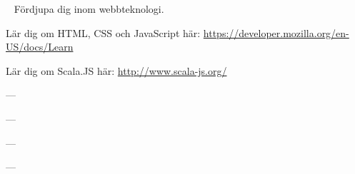 \SOLUTION


\TaskSolved \what

\SubtaskSolved

\SubtaskSolved

\SubtaskSolved


\QUESTEND






\WHAT{}

\QUESTBEGIN

\Task  \what~ Fördjupa dig inom webbteknologi.

\Subtask Lär dig om HTML, CSS och JavaScript här: \url{https://developer.mozilla.org/en-US/docs/Learn}

\Subtask Lär dig om Scala.JS här: \url{http://www.scala-js.org/}\SOLUTION


\TaskSolved \what

\SubtaskSolved  ---

\SubtaskSolved  ---

\SubtaskSolved  ---

\SubtaskSolved  ---
\QUESTEND

